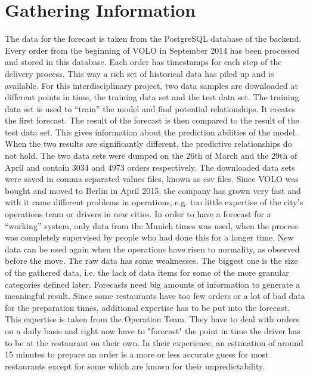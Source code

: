 \section{Gathering Information}\label{section:Gathering Information}
The data for the forecast is taken from the PostgreSQL database of the backend. Every order from the beginning of VOLO in September 2014 has been processed and stored in this database. Each order has timestamps for each step of the delivery process. This way a rich set of historical data has piled up and is available. For this interdisciplinary project, two data samples are downloaded at different points in time, the training data set and the test data set. The training data set is used to “train” the model and find potential relationships. It creates the first forecast. The result of the forecast is then compared to the result of the test data set. This gives information about the prediction abilities of the model. When the two results are significantly different, the predictive relationships do not hold. The two data sets were dumped on the 26th of March and the 29th of April and contain 3034 and 4973 orders respectively. The downloaded data sets were saved in comma separated values files, known as csv files. Since VOLO was bought and moved to Berlin in April 2015, the company has grown very fast and with it came different problems in operations, e.g. too little expertise of the city’s operations team or drivers in new cities. In order to have a forecast for a “working” system, only data from the Munich times was used, when the process was completely supervised by people who had done this for a longer time. New data can be used again when the operations have risen to normality, as observed before the move.\newline
The raw data has some weaknesses. The biggest one is the size of the gathered data, i.e. the lack of data items for some of the more granular categories defined later. Forecasts need big amounts of information to generate a meaningful result. Since some restaurants have too few orders or a lot of bad data for the preparation times, additional expertise has to be put into the forecast. This expertise is taken from the Operation Team. They have to deal with orders on a daily basis and right now have to "forecast" the point in time the driver has to be at the restaurant on their own. In their experience, an estimation of around 15 minutes to prepare an order is a more or less accurate guess for most restaurants except for some which are known for their unpredictability.\newline
